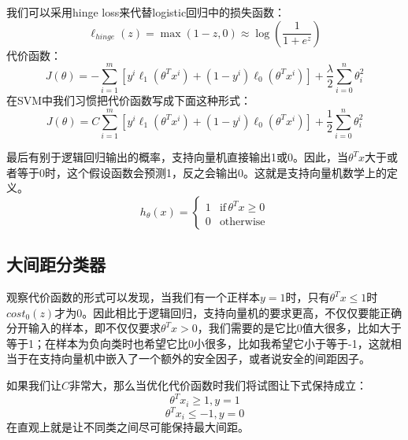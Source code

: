 \documentclass[cn,hazy,blue,normal,14pt]{elegantnote}
\begin{document}
我们可以采用hinge loss来代替logistic回归中的损失函数：
$$
\ell_{hinge}(z)=\max(1-z,0)\approx \log(\frac{1}{1+e^{z}})
$$
代价函数：
$$
J(\theta)=-\sum_{i=1}^{m}[y^i\ell_1(\theta^Tx^i)+(1-y^i)\ell_0(\theta^Tx^i)]+\frac{\lambda}{2}\sum_{i=0}^{n}\theta_i^2
$$
在SVM中我们习惯把代价函数写成下面这种形式：
$$
J(\theta)=C\sum_{i=1}^{m}[y^i\ell_1(\theta^Tx^i)+(1-y^i)\ell_0(\theta^Tx^i)]+\frac{1}{2}\sum_{i=0}^{n}\theta_i^2
$$

最后有别于逻辑回归输出的概率，支持向量机直接输出1或0。因此，当$\theta^Tx$大于或者等于0时，这个假设函数会预测1，反之会输出0。这就是支持向量机数学上的定义。
$$
h_\theta(x)=\begin{cases}
    1 & \text{if} \, \theta ^T x \geqslant 0 \\
    0 &\text{otherwise}
\end{cases}
$$
\subsection{大间距分类器}
观察代价函数的形式可以发现，当我们有一个正样本$y=1$时，只有$\theta^T x \leqslant 1$时$cost_0(z)$才为0。因此相比于逻辑回归，支持向量机的要求更高，不仅仅要能正确分开输入的样本，即不仅仅要求$\theta^Tx>0$，我们需要的是它比0值大很多，比如大于等于1；在样本为负向类时也希望它比0小很多，比如我希望它小于等于-1，这就相当于在支持向量机中嵌入了一个额外的安全因子，或者说安全的间距因子。

如果我们让$C$非常大，那么当优化代价函数时我们将试图让下式保持成立：
$$
\theta^T x_i \geqslant 1,y=1
$$
$$
\theta^T x_i \leqslant -1,y=0
$$
在直观上就是让不同类之间尽可能保持最大间距。
\end{document}
